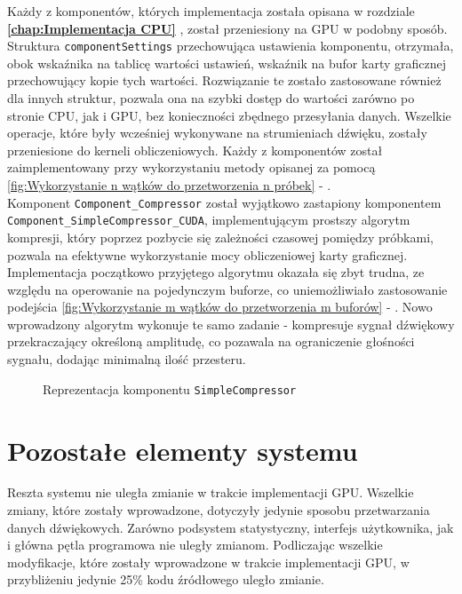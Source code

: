 Każdy z komponentów, których implementacja została opisana w rozdziale \textbf{\ref{chap:Implementacja CPU} }, został przeniesiony na GPU w podobny sposób. Struktura \texttt{componentSettings} przechowująca ustawienia komponentu, otrzymała, obok wskaźnika na tablicę wartości ustawień, wskaźnik na bufor karty graficznej przechowujący kopie tych wartości. Rozwiązanie te zostało zastosowane również dla innych struktur, pozwala ona na szybki dostęp do wartości zarówno po stronie CPU, jak i GPU, bez konieczności zbędnego przesyłania danych. Wszelkie operacje, które były wcześniej wykonywane na strumieniach dźwięku, zostały przeniesione do kerneli obliczeniowych. Każdy z komponentów został zaimplementowany przy wykorzystaniu metody opisanej za pomocą \ref{fig:Wykorzystanie n wątków do przetworzenia n próbek} - . 
\\
Komponent \texttt{Component\_Compressor} został wyjątkowo zastapiony komponentem \texttt{Component\_SimpleCompressor\_CUDA}, implementującym prostszy algorytm kompresji, który poprzez pozbycie się zależności czasowej pomiędzy próbkami, pozwala na efektywne wykorzystanie mocy obliczeniowej karty graficznej. Implementacja początkowo przyjętego algorytmu okazała się zbyt trudna, ze względu na operowanie na pojedynczym buforze, co uniemożliwiało zastosowanie podejścia
\ref{fig:Wykorzystanie m wątków do przetworzenia m buforów} - . 
Nowo wprowadzony algorytm wykonuje te samo zadanie - kompresuje sygnał dźwiękowy przekraczający określoną amplitudę, co pozawala na ograniczenie głośności sygnału, dodając minimalną ilość przesteru. 

\begin{figure}[H]
    \centering
    
    \caption{Reprezentacja komponentu \texttt{SimpleCompressor}}
    \label{fig:Reprezentacja komponentu SimpleCompressor}
\end{figure}


\section{Pozostałe elementy systemu}
Reszta systemu nie uległa zmianie w trakcie implementacji GPU. Wszelkie zmiany, które zostały wprowadzone, dotyczyły jedynie sposobu przetwarzania danych dźwiękowych. Zarówno podsystem statystyczny, interfejs użytkownika, jak i główna pętla programowa nie uległy zmianom. Podliczając wszelkie modyfikacje, które zostały wprowadzone w trakcie implementacji GPU, w przybliżeniu jedynie 25\% kodu źródłowego uległo zmianie. 